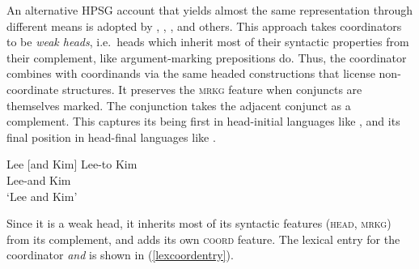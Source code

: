 {\begin{sloppypar}
An alternative HPSG account that yields almost the same representation through different means is adopted by \citet{Abeille:03}, \citet{Abeille:05}, \citet{Mouret:07} \citet{Bilbiie:17}, and others. This approach
takes coordinators to be \emph{weak heads}, i.e.\ heads which inherit most of their syntactic properties from their complement,
like argument-marking prepositions do. Thus, the coordinator combines with coordinands via the same headed constructions that license non-coordinate structures.
It  preserves the \textsc{mrkg} feature when conjuncts are themselves marked. The conjunction takes the adjacent conjunct as a complement. This captures its being first in head-initial languages like , and its final position in head-final languages like .
\end{sloppypar}

\eal
\settowidth{}
\ex Lee [and Kim]
\ex 
\gll Lee-to Kim\\
     Lee-and Kim\\
\glt `Lee and Kim'
\zl

\noindent
Since it is a weak head, it inherits most of  its syntactic features (\textsc{head}, \textsc{mrkg}) from its complement, and adds its own  \textsc{coord} feature. The lexical entry for the coordinator \emph{and} is shown in (\ref{lexcoordentry}).

\begin{exe}
\ex 
{}\label{lexcoordentry}
\end{exe}

}

